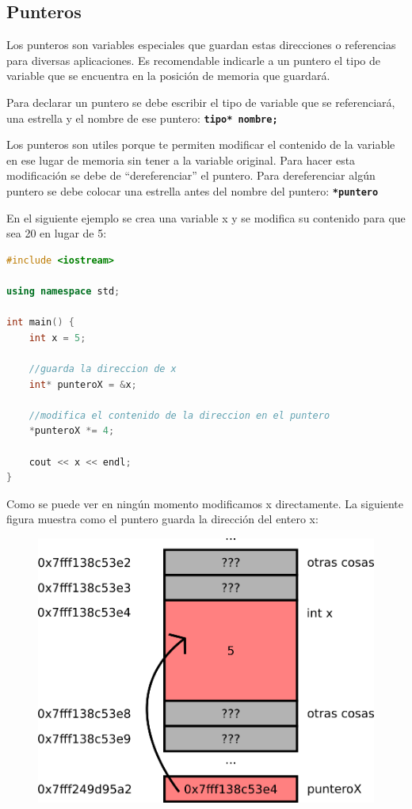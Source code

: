 \documentclass{article}
\begin{document}
\subsection{Punteros}

Los punteros son variables especiales que guardan estas direcciones o referencias para diversas aplicaciones. Es recomendable indicarle a un puntero el tipo de variable que se encuentra en la posición de memoria que guardará.

Para declarar un puntero se debe escribir el tipo de variable que se referenciará, una estrella y el nombre de ese puntero: \textbf{\lstinline{tipo* nombre;}}

Los punteros son utiles porque te permiten modificar el contenido de la variable en ese lugar de memoria sin tener a la variable original. Para hacer esta modificación se debe de ``dereferenciar'' el puntero. Para dereferenciar algún puntero se debe colocar una estrella antes del nombre del puntero: \textbf{\lstinline{*puntero}}

En el siguiente ejemplo se crea una variable x y se modifica su contenido para que sea 20 en lugar de 5:

\begin{lstlisting}[language=C++, title=Referencias]
#include <iostream>

using namespace std;

int main() {
	int x = 5;

	//guarda la direccion de x
	int* punteroX = &x;

	//modifica el contenido de la direccion en el puntero
	*punteroX *= 4;

	cout << x << endl;
}
\end{lstlisting}

Como se puede ver en ningún momento modificamos x directamente. La siguiente figura muestra como el puntero guarda la dirección del entero x:

\begin{figure}[H]
    \centering
    \includegraphics[width=0.4\paperwidth]{puntero}
\end{figure}
\end{document}
